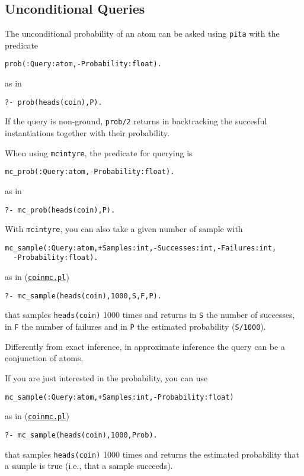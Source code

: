 \subsection{Unconditional Queries}
\label{uncondq}
The unconditional probability of an atom can be asked using \verb|pita| with the predicate
\begin{verbatim}
prob(:Query:atom,-Probability:float).
\end{verbatim}
as in
\begin{verbatim}
?- prob(heads(coin),P).
\end{verbatim}
If the query is non-ground, \verb|prob/2| returns in backtracking the succesful instantiations together with their probability.

When using \verb|mcintyre|, the predicate for querying is 
\begin{verbatim}
mc_prob(:Query:atom,-Probability:float).
\end{verbatim} as in
\begin{verbatim}
?- mc_prob(heads(coin),P).
\end{verbatim}
With \verb|mcintyre|, you can also take a given number of sample with
\begin{verbatim}
mc_sample(:Query:atom,+Samples:int,-Successes:int,-Failures:int,
  -Probability:float).
\end{verbatim}
as in (\href{http://cplint.lamping.unife.it/example/inference/coinmc.pl}{\texttt{coinmc.pl}})
\begin{verbatim}
?- mc_sample(heads(coin),1000,S,F,P).
\end{verbatim}
that samples \verb|heads(coin)| 1000 times and returns in \verb|S| the number of successes, in \verb|F| the number of failures and in \verb|P| the
estimated probability (\verb|S/1000|).

Differently from exact inference, in approximate inference the query can be a conjunction of atoms.

If you are just interested in the probability, you can use
\begin{verbatim}
mc_sample(:Query:atom,+Samples:int,-Probability:float) 
\end{verbatim}
as in (\href{http://cplint.lamping.unife.it/example/inference/coinmc.pl}{\texttt{coinmc.pl}})
\begin{verbatim}
?- mc_sample(heads(coin),1000,Prob).
\end{verbatim}
that samples \verb|heads(coin)| 1000 times and returns the
estimated probability that a sample is true (i.e., that a sample succeeds).


